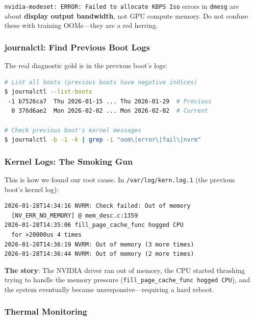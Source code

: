 \documentclass[11pt,a4paper]{article}
\begin{document}
\begin{warningbox}
\texttt{nvidia-modeset: ERROR: Failed to allocate KBPS Iso} errors in \texttt{dmesg} are about \textbf{display output bandwidth}, not GPU compute memory. Do not confuse these with training OOMs---they are a red herring.
\end{warningbox}

\subsubsection{journalctl: Find Previous Boot Logs}

The real diagnostic gold is in the previous boot's logs:

\begin{lstlisting}[language=bash,caption=Using journalctl to find crash evidence]
# List all boots (previous boots have negative indices)
$ journalctl --list-boots
 -1 b7526ca7  Thu 2026-01-15 ... Thu 2026-01-29  # Previous
  0 376d6ae2  Mon 2026-02-02 ... Mon 2026-02-02  # Current

# Check previous boot's kernel messages
$ journalctl -b -1 -k | grep -i "oom\|error\|fail\|nvrm"
\end{lstlisting}

\subsubsection{Kernel Logs: The Smoking Gun}

This is how we found our root cause. In \texttt{/var/log/kern.log.1} (the previous boot's kernel log):

\begin{lstlisting}[caption=The GPU OOM evidence from kernel logs]
2026-01-28T14:34:16 NVRM: Check failed: Out of memory 
  [NV_ERR_NO_MEMORY] @ mem_desc.c:1359
2026-01-28T14:35:06 fill_page_cache_func hogged CPU 
  for >20000us 4 times
2026-01-28T14:36:19 NVRM: Out of memory (3 more times)
2026-01-28T14:36:44 NVRM: Out of memory (2 more times)
\end{lstlisting}

\textbf{The story}: The NVIDIA driver ran out of memory, the CPU started thrashing trying to handle the memory pressure (\texttt{fill\_page\_cache\_func hogged CPU}), and the system eventually became unresponsive---requiring a hard reboot.

\subsubsection{Thermal Monitoring}
\end{document}

